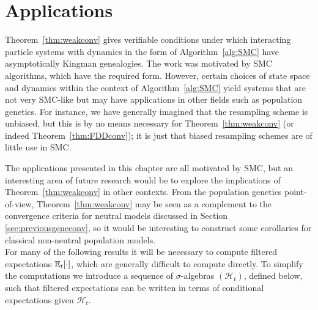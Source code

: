 \chapter{Applications} %
\label{ch:appl}



Theorem~\ref{thm:weakconv} gives verifiable conditions under which interacting particle systems with dynamics in the form of Algorithm~\ref{alg:SMC} have asymptotically Kingman genealogies. 
The work was motivated by SMC algorithms, which have the required form. However, certain choices of state space and dynamics within the context of Algorithm~\ref{alg:SMC} yield systems that are not very SMC-like but may have applications in other fields such as population genetics. 
For instance, we have generally imagined that the resampling scheme is unbiased, but this is by no means necessary for Theorem~\ref{thm:weakconv} (or indeed Theorem~\ref{thm:FDDconv}); it is just that biased resampling schemes are of little use in SMC.

The applications presented in this chapter are all motivated by SMC, but an interesting area of future research would be to explore the implications of Theorem~\ref{thm:weakconv} in other contexts. From the population genetics point-of-view, Theorem~\ref{thm:weakconv} may be seen as a complement to the convergence criteria for neutral models discussed in Section \ref{sec:previousgeneconv}, so it would be interesting to construct some corollaries for classical non-neutral population models.\\

For many of the following results it will be necessary to compute filtered expectations $\mathbb{E}_t[\cdot]$, which are generally difficult to compute directly. 
To simplify the computations we introduce a sequence of $\sigma$-algebras $(\mathcal{H}_t)$, defined below, such that filtered expectations can be written in terms of conditional expectations given $\mathcal{H}_t$.

